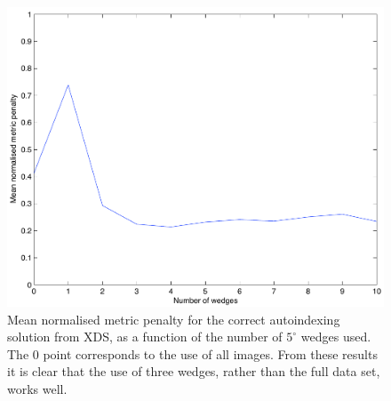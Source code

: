 \documentclass[preprint,pdf]{iucr}
\begin{document}
\begin{figure}
\caption{Mean normalised metric penalty for the correct autoindexing 
solution from XDS, as a function of the number of $5^{\circ}$ wedges used.
The 0 point corresponds to the use of all images. From these results it is
clear that the use of three wedges, rather than the full data set, works
well.
\label{figure:xds_n_images}}
\centering
\includegraphics[scale=0.5]{figures/xds_n_wedges.pdf}
\end{figure}
\end{document}

